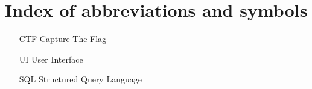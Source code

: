 
\chapter{Index of abbreviations and symbols}

\begin{itemize}
	\item[CTF] Capture The Flag
	\item[UI] User Interface
	\item[SQL] Structured Query Language
\end{itemize}
